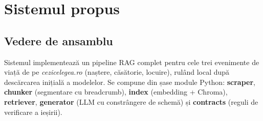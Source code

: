\chapter{Sistemul propus}

\section{Vedere de ansamblu}

Sistemul implementează un pipeline RAG complet pentru cele trei evenimente de viață de pe \emph{cezicelegea.ro} \cite{cezicelegea} (naștere, căsătorie, locuire), rulând local după descărcarea inițială a modelelor. Se compune din șase module Python: \textbf{scraper}, \textbf{chunker} (segmentare cu breadcrumb), \textbf{index} (embedding + Chroma), \textbf{retriever}, \textbf{generator} (LLM cu constrângere de schemă) și \textbf{contracts} (reguli de verificare a ieșirii).

